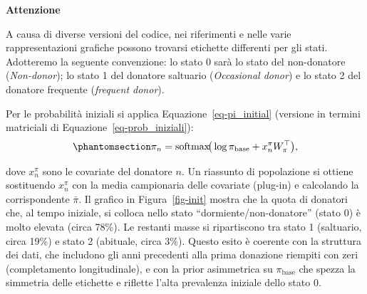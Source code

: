 \documentclass[
  italian,
  a4paper,
  a4paper,
  twoside,
  open=right,
  12pt]{scrbook}
\theoremstyle{definition}
\theoremstyle{remark}
\begin{document}
\begin{tcolorbox}[enhanced jigsaw, breakable, colframe=quarto-callout-note-color-frame, toprule=.15mm, colback=white, opacityback=0, rightrule=.15mm, bottomrule=.15mm, leftrule=.75mm, left=2mm, arc=.35mm]
\begin{minipage}[t]{5.5mm}
\textcolor{quarto-callout-note-color}{\faInfo}
\end{minipage}%
\begin{minipage}[t]{\textwidth - 5.5mm}

\vspace{-3mm}\textbf{Attenzione}\vspace{3mm}

A causa di diverse versioni del codice, nei riferimenti e nelle varie
rappresentazioni grafiche possono trovarsi etichette differenti per gli
stati. Adotteremo la seguente convenzione: lo stato 0 sarà lo stato del
non-donatore (\emph{Non-donor}); lo stato 1 del donatore saltuario
(\emph{Occasional donor}) e lo stato 2 del donatore frequente
(\emph{frequent donor}).

\end{minipage}%
\end{tcolorbox}

Per le probabilità iniziali si applica Equazione~\ref{eq-pi_initial}
(versione in termini matriciali di Equazione~\ref{eq-prob_iniziali}):
\begin{equation}\phantomsection\label{eq-pi_initial}{
\pi_n  =  \text{softmax}\!\big(\log \pi_{\text{base}} + x^\pi_n W_\pi^\top\big),
}\end{equation}

dove \(x^\pi_n\) sono le covariate del donatore \(n\). Un riassunto di
popolazione si ottiene sostituendo \(x^\pi_n\) con la media campionaria
delle covariate (plug-in) e calcolando la corrispondente \(\bar\pi\). Il
grafico in Figura~\ref{fig-init} mostra che la quota di donatori che, al
tempo iniziale, si colloca nello stato ``dormiente/non-donatore'' (stato
0) è molto elevata (circa 78\%). Le restanti masse si ripartiscono tra
stato 1 (saltuario, circa 19\%) e stato 2 (abituale, circa 3\%). Questo
esito è coerente con la struttura dei dati, che includono gli anni
precedenti alla prima donazione riempiti con zeri (completamento
longitudinale), e con la prior asimmetrica su \(\pi_{\text{base}}\) che
spezza la simmetria delle etichette e riflette l'alta prevalenza
iniziale dello stato 0.
\end{document}
